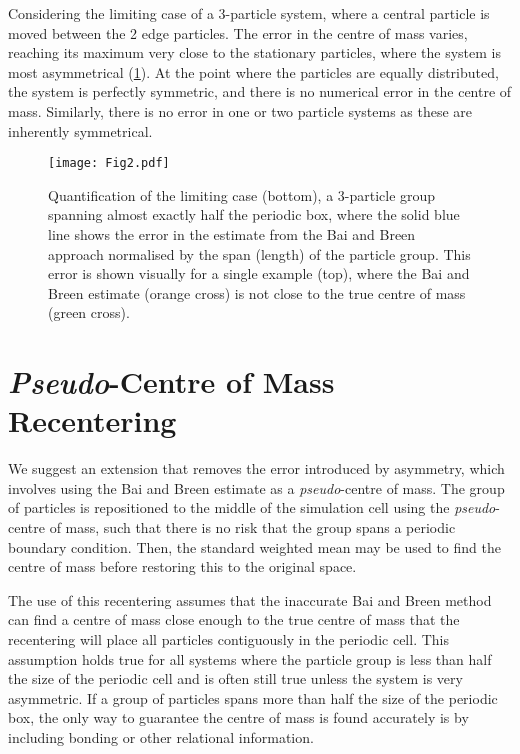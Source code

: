 \documentclass[reprint,superscriptaddress,nobibnotes,amsmath,amssymb,aip]{revtex4-2}
\begin{document}
Considering the limiting case of a 3-particle system, where a central particle is moved between the 2 edge particles.
The error in the centre of mass varies, reaching its maximum very close to the stationary particles, where the system is most asymmetrical (\cref{fig:error_quantification}). 
At the point where the particles are equally distributed, the system is perfectly symmetric, and there is no numerical error in the centre of mass. 
Similarly, there is no error in one or two particle systems as these are inherently symmetrical. 
%
\begin{figure}
    \centering
    \texttt{[image: Fig2.pdf]}
    \caption{Quantification of the limiting case (bottom), a 3-particle group spanning almost exactly half the periodic box, where the solid blue line shows the error in the estimate from the Bai and Breen approach normalised by the span (length) of the particle group.
    This error is shown visually for a single example (top), where the Bai and Breen estimate (orange cross) is not close to the true centre of mass (green cross).}
    \label{fig:error_quantification}
\end{figure}
%

\section{\emph{Pseudo}-Centre of Mass Recentering}

We suggest an extension that removes the error introduced by asymmetry, which involves using the Bai and Breen estimate as a \emph{pseudo}-centre of mass. 
The group of particles is repositioned to the middle of the simulation cell using the \emph{pseudo}-centre of mass, such that there is no risk that the group spans a periodic boundary condition. 
Then, the standard weighted mean may be used to find the centre of mass before restoring this to the original space. 

The use of this recentering assumes that the inaccurate Bai and Breen method can find a centre of mass close enough to the true centre of mass that the recentering will place all particles contiguously in the periodic cell. 
This assumption holds true for all systems where the particle group is less than half the size of the periodic cell and is often still true unless the system is very asymmetric. 
If a group of particles spans more than half the size of the periodic box, the only way to guarantee the centre of mass is found accurately is by including bonding or other relational information. 
\end{document}
